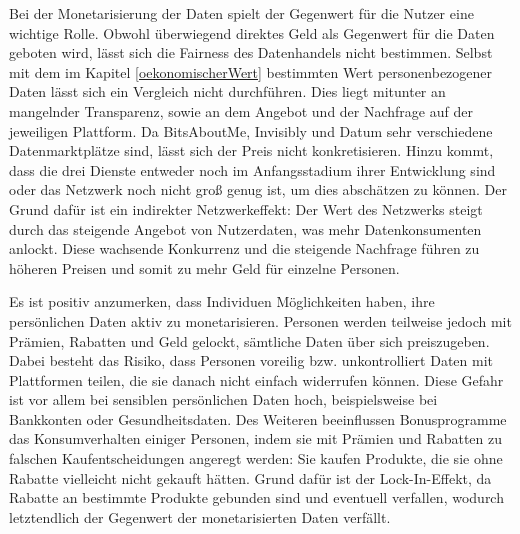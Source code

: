 \noindent Bei der Monetarisierung der Daten spielt der Gegenwert für die Nutzer eine wichtige Rolle. Obwohl überwiegend direktes Geld als Gegenwert für die Daten geboten wird, lässt sich die Fairness des Datenhandels nicht bestimmen. Selbst mit dem im Kapitel \ref{oekonomischerWert} bestimmten Wert personenbezogener Daten lässt sich ein Vergleich nicht durchführen. Dies liegt mitunter an mangelnder Transparenz, sowie an dem Angebot und der Nachfrage auf der jeweiligen Plattform. Da BitsAboutMe, Invisibly und Datum sehr verschiedene Datenmarktplätze sind, lässt sich der Preis nicht konkretisieren. Hinzu kommt, dass die drei Dienste entweder noch im Anfangsstadium ihrer Entwicklung sind oder das Netzwerk noch nicht groß genug ist, um dies abschätzen zu können. Der Grund dafür ist ein indirekter Netzwerkeffekt: Der Wert des Netzwerks steigt durch das steigende Angebot von Nutzerdaten, was mehr Datenkonsumenten anlockt. Diese wachsende Konkurrenz und die steigende Nachfrage führen zu höheren Preisen und somit zu mehr Geld für einzelne Personen. \newline

\noindent Es ist positiv anzumerken, dass Individuen Möglichkeiten haben, ihre persönlichen Daten aktiv zu monetarisieren. Personen werden teilweise jedoch mit Prämien, Rabatten und Geld gelockt, sämtliche Daten über sich preiszugeben. Dabei besteht das Risiko, dass Personen voreilig bzw. unkontrolliert Daten mit Plattformen teilen, die sie danach nicht einfach widerrufen können. Diese Gefahr ist vor allem bei sensiblen persönlichen Daten hoch, beispielsweise bei Bankkonten oder Gesundheitsdaten. Des Weiteren beeinflussen Bonusprogramme das Konsumverhalten einiger Personen, indem sie mit Prämien und Rabatten zu falschen Kaufentscheidungen angeregt werden: Sie kaufen Produkte, die sie ohne Rabatte vielleicht nicht gekauft hätten. Grund dafür ist der Lock-In-Effekt, da Rabatte an bestimmte Produkte gebunden sind und eventuell verfallen, wodurch letztendlich der Gegenwert der monetarisierten Daten verfällt. \newline

